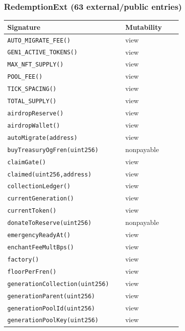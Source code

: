 \subsubsection*{RedemptionExt \;\normalfont\small(63 external/public entries)}
\begin{longtable}{@{}p{0.62\linewidth}p{0.30\linewidth}@{}}
\toprule \textbf{Signature} & \textbf{Mutability} \\ \midrule \endhead
\texttt{\scriptsize AUTO\_MIGRATE\_FEE()} & view \\
\texttt{\scriptsize GEN1\_ACTIVE\_TOKENS()} & view \\
\texttt{\scriptsize MAX\_NFT\_SUPPLY()} & view \\
\texttt{\scriptsize POOL\_FEE()} & view \\
\texttt{\scriptsize TICK\_SPACING()} & view \\
\texttt{\scriptsize TOTAL\_SUPPLY()} & view \\
\texttt{\scriptsize airdropReserve()} & view \\
\texttt{\scriptsize airdropWallet()} & view \\
\texttt{\scriptsize autoMigrate(address)} & view \\
\texttt{\scriptsize buyTreasuryOgFren(uint256)} & nonpayable \\
\texttt{\scriptsize claimGate()} & view \\
\texttt{\scriptsize claimed(uint256,address)} & view \\
\texttt{\scriptsize collectionLedger()} & view \\
\texttt{\scriptsize currentGeneration()} & view \\
\texttt{\scriptsize currentToken()} & view \\
\texttt{\scriptsize donateToReserve(uint256)} & nonpayable \\
\texttt{\scriptsize emergencyReadyAt()} & view \\
\texttt{\scriptsize enchantFeeMultBps()} & view \\
\texttt{\scriptsize factory()} & view \\
\texttt{\scriptsize floorPerFren()} & view \\
\texttt{\scriptsize generationCollection(uint256)} & view \\
\texttt{\scriptsize generationParent(uint256)} & view \\
\texttt{\scriptsize generationPoolId(uint256)} & view \\
\texttt{\scriptsize generationPoolKey(uint256)} & view \\

\end{longtable}
